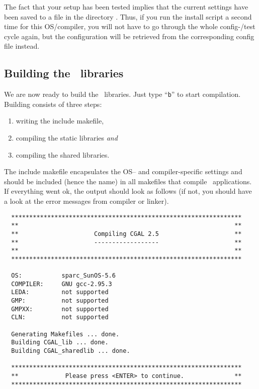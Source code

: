 The fact that your setup has been tested implies that the current
settings have been saved to a file in the directory \cgalinstconfdir.
Thus, if you run the install script a second time for this
OS/compiler, you will not have to go through the whole config-/test
cycle again, but the configuration will be retrieved from the
corresponding config file instead.

\subsection{Building the \cgal\ libraries}\label{sec:build-the-libs}

We are now ready to build the \cgal\ libraries.  Just type ``{\tt b}''
to start compilation. Building consists of three steps:
\begin{enumerate}
\item writing the include makefile,
\item compiling the static libraries \textit{and}
\item compiling the shared libraries.
\end{enumerate}
The include makefile encapsulates the OS-- and
compiler-specific settings and should be included (hence the name) in
all makefiles that compile \cgal\ applications. If everything went ok,
the output should look as follows (if not, you should have a look at
the error messages from compiler or linker).

{\ccTexHtml{\scriptsize}{}
\begin{verbatim}
  ****************************************************************
  **                                                            **
  **                     Compiling CGAL 2.5                     **
  **                     ------------------                     **
  **                                                            **
  ****************************************************************

  OS:           sparc_SunOS-5.6
  COMPILER:     GNU gcc-2.95.3
  LEDA:         not supported
  GMP:          not supported
  GMPXX:        not supported
  CLN:          not supported

  Generating Makefiles ... done.
  Building CGAL_lib ... done.
  Building CGAL_sharedlib ... done.

  ****************************************************************
  **             Please press <ENTER> to continue.              **
  ****************************************************************
\end{verbatim}}
{
}  

